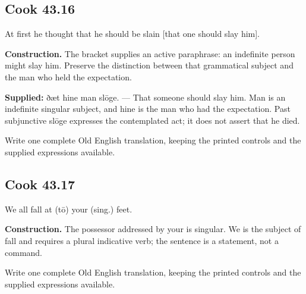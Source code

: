 \par\begin{minipage}{\linewidth}\raggedright
\subsection*{Cook 43.16}

At first he thought that he should be slain [that one should slay him].

\end{minipage}\par\addvspace{4pt}

\textbf{Construction.} The bracket supplies an active paraphrase: an indefinite person might slay him. Preserve the distinction between that grammatical subject and the man who held the expectation.

\textbf{Supplied:} ðæt hine man slōge. — That someone should slay him. Man is an indefinite singular subject, and hine is the man who had the expectation. Past subjunctive slōge expresses the contemplated act; it does not assert that he died.

Write one complete Old English translation, keeping the printed controls and the supplied expressions available.

\par\begin{minipage}{\linewidth}\raggedright
\subsection*{Cook 43.17}

We all fall at (tō) your (sing.) feet.

\textbf{Construction.} The possessor addressed by your is singular. We is the subject of fall and requires a plural indicative verb; the sentence is a statement, not a command.

Write one complete Old English translation, keeping the printed controls and the supplied expressions available.

\end{minipage}\par\addvspace{4pt}

